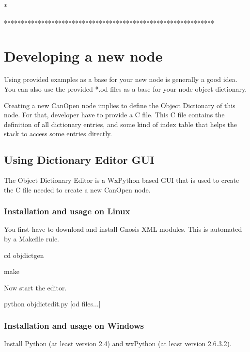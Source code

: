 \documentclass[a4paper,12pt]{book}
\begin{document}
{\ttfamily
*
\space \space \space \space \space \space \space \space \space \space \space \space \space \space \space \space \space \space \space \space \space \space \space \space \space \space \space \space \space \space \space \space \space \space \space \space \space \space \space \space \space \space \space \space \space \space \space \space \space \space \space \space \space \space \space \space \space \space \space *}

{\ttfamily
**************************************************************}

\section{Developing a new node}
Using provided examples as a base for your new node is generally a good
idea. You can also use the provided *.od files as a base for your node
object dictionary.

Creating a new CanOpen node implies to define the Object Dictionary of
this node. For that, developer have to provide a C file. This C file
contains the definition of all dictionary entries, and some kind of
index table that helps the stack to access some entries directly.

\subsection{Using Dictionary Editor GUI}
The Object Dictionary Editor is a WxPython based GUI that is used to
create the C file needed to create a new CanOpen node. 

\subsubsection{Installation and usage on Linux}
You first have to download and install Gnosis XML modules. This is
automated by a Makefile rule.

{\ttfamily
cd objdictgen}

{\ttfamily
make}

Now start the editor.

{\ttfamily
python objdictedit.py [od files...]}

\subsubsection{Installation and usage on Windows}
Install Python (at least version 2.4) and wxPython (at least version
2.6.3.2).
\end{document}
